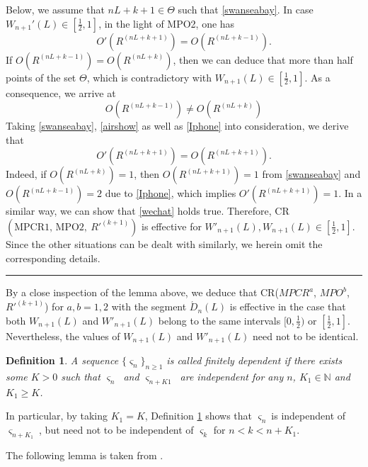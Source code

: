 \documentclass[11pt]{article}
\newtheorem{defn}[thm]{Definition}
\newcommand{\fin}{\hspace*{\fill}\rule{0.3em}{1ex}}
\newenvironment{proof}{{\bf \noindent Proof.}}{\fin}
\numberwithin{equation}{section}
\begin{document}
\begin{proof}
 Below, we assume that $nL+k+1\in \Theta$ such that \eqref{swanseabay}. In case $W_{n+1}'(L)\in[\frac{1}{2},1]$, in the light of MPO2, one has 
 \begin{equation}\label{airshow}
O'(R^{(nL+k+1)})=O(R^{(nL+k-1)}).
\end{equation}
If $O(R^{(nL+k-1)})=O(R^{(nL+k)})$, then we can deduce that more than half points of the set $\Theta$, which is contradictory with $W_{n+1}(L)\in[\frac{1}{2},1]$. As a consequence, we arrive at 
\begin{equation}\label{Iphone}
 O(R^{(nL+k-1)})\neq O(R^{(nL+k)})
 \end{equation}
 Taking \eqref{swanseabay}, \eqref{airshow} as well as \eqref{Iphone} into consideration, we derive that 
 \begin{equation}\label{wechat}
O'(R^{(nL+k+1)})=O(R^{(nL+k+1)}).
\end{equation}
Indeed, if $O(R^{(nL+k)})=1$, then $O(R^{(nL+k+1)})=1$ from \eqref{swanseabay} and 
 $O(R^{(nL+k-1)})=2$ due to \eqref{Iphone}, which implies $O'(R^{(nL+k+1)})=1$. In a similar way, we can show that \eqref{wechat} holds true. Therefore, CR$(\mbox{MPCR1,  MPO2},~  R'^{(k+1)})$ is effective for $W'_{n+1}(L), W_{n+1}(L)\in [\frac{1}{2},1]$.   Since the other situations can be dealt with similarly, we herein omit the corresponding details. 
\end{proof}

By a close inspection of the lemma above,  we deduce  that CR($MPCR^{a}$,  $MPO^{b}$, $R'^{(k+1)}$) for $ a,b=1,2 $ with the  segment  $ \acute{D}_n(L)$ is effective in the case that  both $ W_{n+1}(L)$ and  $ W'_{n+1}(L)$ belong   to the same intervals $[0,\frac{1}{2})$  or 
$[\frac{1}{2},1]$. Nevertheless,    the values of $ W_{n+1}(L)$ and  $ W'_{n+1}(L)$  need not to be identical. 
 
 \begin{defn}\label{London}
 A sequence  $\{\varsigma_n\}_{n\ge 1}$  is called finitely dependent if there exists some $K>0$ such that $\varsigma_n\ $ and $\varsigma_{n+K1}\ $ are independent for any $n$, $K_1\in \mathbb{N}$ and $K_1\geqslant K$. 
 \end{defn}
  
In particular, by taking $K_1=K$, Definition \ref{London} shows that $\varsigma_n\ $is independent of $\varsigma_{n+K_1}\ $, but need not to be independent of $\varsigma_k$ for  $n<k<n+K_1$.
 
The following lemma is taken from \cite{ALZ2001}. 
 
\end{document}
